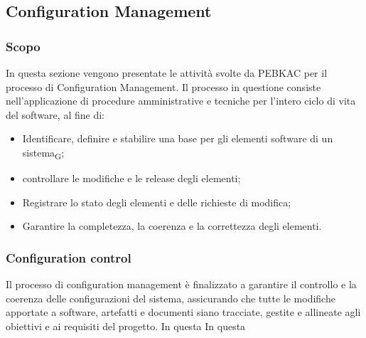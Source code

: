 \subsection{Configuration Management}
\subsubsection{Scopo}
In questa sezione vengono presentate le attività svolte da PEBKAC per il processo di Configuration Management. Il processo in questione consiste nell'applicazione di procedure amministrative e tecniche per l'intero ciclo di vita del software, al fine di:
\begin{itemize}
    \item Identificare, definire e stabilire una base per gli elementi software di un sistema\textsubscript{G};
    \item controllare le modifiche e le release degli elementi;
    \item Registrare lo stato degli elementi e delle richieste di modifica;
    \item Garantire la completezza, la coerenza e la correttezza degli elementi.
\end{itemize}

\subsubsection{Configuration control}
Il processo di configuration management è finalizzato a garantire il controllo e la coerenza delle configurazioni del sistema, assicurando che tutte le modifiche apportate a software, artefatti e documenti siano tracciate, gestite e allineate agli obiettivi e ai requisiti del progetto.
In questa
In questa 